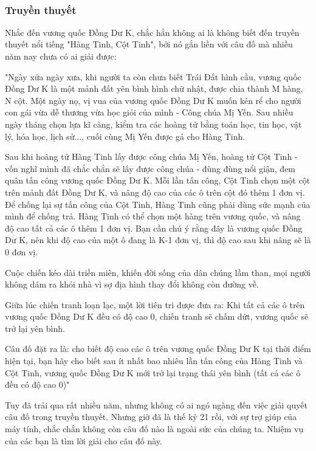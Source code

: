 

 

\subsubsection{Truyền thuyết}

Nhắc đến vương quốc Đồng Dư K, chắc hẳn không ai là không biết đến truyền thuyết nổi tiếng "Hàng Tinh, Cột Tinh", bởi nó gắn liền với câu đố mà nhiều năm nay chưa có ai giải được:

"Ngày xửa ngày xưa, khi người ta còn chưa biết Trái Đất hình cầu, vương quốc Đồng Dư K là một mảnh đất yên bình hình chữ nhật, được chia thành M hàng, N cột. Một ngày nọ, vị vua của vương quốc Đồng Dư K muốn kén rể cho người con gái vừa dễ thương vừa học giỏi của mình - Công chúa Mị Yến. Sau nhiều ngày tháng chọn lựa kĩ càng, kiểm tra các hoàng tử bằng toán học, tin học, vật lý, hóa học, lịch sử..., cuối cùng Mị Yến được gả cho Hàng Tinh.

Sau khi hoàng tử Hàng Tinh lấy được công chúa Mị Yến, hoàng tử Cột Tinh - vốn nghĩ mình đã chắc chắn sẽ lấy được công chúa - đùng đùng nổi giận, đem quân tấn công vương quốc Đồng Dư K. Mỗi lần tấn công, Cột Tinh chọn một cột trên mảnh đất Đồng Dư K, và nâng độ cao của các ô trên cột đó thêm 1 đơn vị. Để chống lại sự tấn công của Cột Tinh, Hàng Tinh cũng phải dùng sức mạnh của mình để chống trả. Hàng Tinh có thể chọn một hàng trên vương quốc, và nâng độ cao tất cả các ô thêm 1 đơn vị. Bạn cần chú ý rằng đây là vương quốc Đồng Dư K, nên khi độ cao của một ô đang là K-1 đơn vị, thì độ cao sau khi nâng sẽ là 0 đơn vị.

Cuộc chiến kéo dài triền miên, khiến đời sống của dân chúng lầm than, mọi người không dám ra khỏi nhà vì sợ địa hình thay đổi không còn đường về.

Giữa lúc chiến tranh loạn lạc, một lời tiên tri được đưa ra: Khi tất cả các ô trên vương quốc Đồng Dư K đều có độ cao 0, chiến tranh sẽ chấm dứt, vương quốc sẽ trở lại yên bình.

Câu đố đặt ra là: cho biết độ cao các ô trên vương quốc Đồng Dư K tại thời điểm hiện tại, bạn hãy cho biết sau ít nhất bao nhiêu lần tấn công của Hàng Tinh và Cột Tinh, vương quốc Đồng Dư K mới trở lại trạng thái yên bình (tất cả các ô đều có độ cao 0)"

Tuy đã trải qua rất nhiều năm, nhưng không có ai ngó ngàng đến việc giải quyết câu đố trong truyền thuyết. Nhưng giờ đã là thế kỷ 21 rồi, với sự trợ giúp của máy tính, chắc chắn không còn câu đố nào là ngoài sức của chúng ta. Nhiệm vụ của các bạn là tìm lời giải cho câu đố này.

